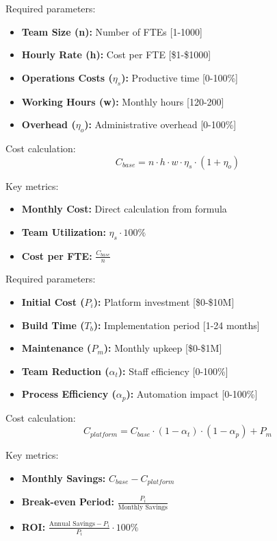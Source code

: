 \documentclass[12pt,a4paper]{article}
\newenvironment{definition}[1]
{\begin{mdframed}[style=definitionstyle,frametitle={Definition: #1}]}
{\end{mdframed}}
\begin{document}
\begin{definition}{Base Team Model Inputs}
Required parameters:
\begin{itemize}
    \item \textbf{Team Size (n):} Number of FTEs [1-1000]
    \item \textbf{Hourly Rate (h):} Cost per FTE [\$1-\$1000]
    \item \textbf{Operations Costs ($\eta_s$):} Productive time [0-100\%]
    \item \textbf{Working Hours (w):} Monthly hours [120-200]
    \item \textbf{Overhead ($\eta_o$):} Administrative overhead [0-100\%]
\end{itemize}

Cost calculation:
\begin{equation}
    C_{base} = n \cdot h \cdot w \cdot \eta_s \cdot (1 + \eta_o)
\end{equation}

Key metrics:
\begin{itemize}
    \item \textbf{Monthly Cost:} Direct calculation from formula
    \item \textbf{Team Utilization:} $\eta_s \cdot 100\%$
    \item \textbf{Cost per FTE:} $\frac{C_{base}}{n}$
\end{itemize}
\end{definition}

\begin{definition}{Team Platform Solution Inputs}
Required parameters:
\begin{itemize}
    \item \textbf{Initial Cost ($P_i$):} Platform investment [\$0-\$10M]
    \item \textbf{Build Time ($T_b$):} Implementation period [1-24 months]
    \item \textbf{Maintenance ($P_m$):} Monthly upkeep [\$0-\$1M]
    \item \textbf{Team Reduction ($\alpha_t$):} Staff efficiency [0-100\%]
    \item \textbf{Process Efficiency ($\alpha_p$):} Automation impact [0-100\%]
\end{itemize}

Cost calculation:
\begin{equation}
    C_{platform} = C_{base} \cdot (1 - \alpha_t) \cdot (1 - \alpha_p) + P_m
\end{equation}

Key metrics:
\begin{itemize}
    \item \textbf{Monthly Savings:} $C_{base} - C_{platform}$
    \item \textbf{Break-even Period:} $\frac{P_i}{\text{Monthly Savings}}$
    \item \textbf{ROI:} $\frac{\text{Annual Savings} - P_i}{P_i} \cdot 100\%$
\end{itemize}
\end{definition}
\end{document}
